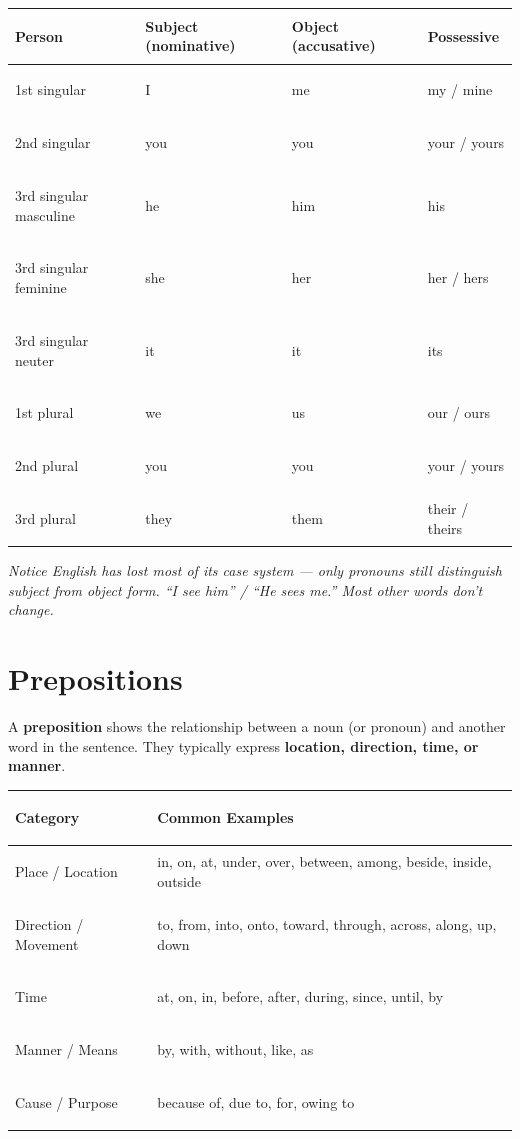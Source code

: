 \documentclass[11pt, letterpaper]{article}
\begin{document}
\noindent
{\renewcommand{\arraystretch}{1.4}
\begin{tabularx}{\textwidth}{>{\bfseries\raggedright\arraybackslash}p{4cm}
                              >{\raggedright\arraybackslash}X
                              >{\raggedright\arraybackslash}X
                              >{\raggedright\arraybackslash}X}
\toprule
\rowcolor{tableheader}
\textbf{Person} & \textbf{Subject (nominative)} & \textbf{Object (accusative)} & \textbf{Possessive} \\
\midrule
\rowcolor{rowA}  1st singular & I       & me   & my / mine \\
\rowcolor{rowB}  2nd singular & you     & you  & your / yours \\
\rowcolor{rowA}  3rd singular masculine & he & him & his \\
\rowcolor{rowB}  3rd singular feminine & she & her & her / hers \\
\rowcolor{rowA}  3rd singular neuter & it & it & its \\
\rowcolor{rowB}  1st plural & we & us & our / ours \\
\rowcolor{rowA}  2nd plural & you & you & your / yours \\
\rowcolor{rowB}  3rd plural & they & them & their / theirs \\
\bottomrule
\end{tabularx}}

\textit{Notice English has lost most of its case system --- only pronouns still distinguish subject from object form. ``I see him'' / ``He sees me.'' Most other words don't change.}

\section*{Prepositions}

A \textbf{preposition} shows the relationship between a noun (or pronoun) and another word
in the sentence. They typically express \textbf{location, direction, time, or manner}.

\noindent
{\renewcommand{\arraystretch}{1.5}
\begin{tabularx}{\textwidth}{>{\bfseries\raggedright\arraybackslash}p{2.5cm}
                              >{\raggedright\arraybackslash}X}
\toprule
\rowcolor{tableheader}
\textbf{Category} & \textbf{Common Examples} \\
\midrule
\rowcolor{rowA}  Place / Location & in, on, at, under, over, between, among, beside, inside, outside \\
\rowcolor{rowB}  Direction / Movement & to, from, into, onto, toward, through, across, along, up, down \\
\rowcolor{rowA}  Time            & at, on, in, before, after, during, since, until, by \\
\rowcolor{rowB}  Manner / Means  & by, with, without, like, as \\
\rowcolor{rowA}  Cause / Purpose & because of, due to, for, owing to \\
\bottomrule
\end{tabularx}}
\end{document}
